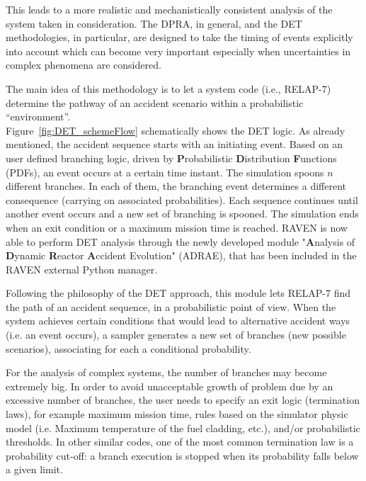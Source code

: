 \documentclass{mc2013}
\begin{document}
This leads to a more realistic and mechanistically consistent analysis of the system taken in consideration. The DPRA, in general, and the DET methodologies, in particular, are designed to take the timing of events explicitly into account which can become very important especially when uncertainties in complex phenomena are considered. 

The main idea of this methodology is to let a system code (i.e., RELAP-7) determine the pathway of an accident scenario within a probabilistic ``environment''. \\ Figure~\ref{fig:DET_schemeFlow} schematically shows the DET logic. As already mentioned, the accident sequence starts with an initiating event. Based on an user defined branching logic, driven by \textbf{P}robabilistic \textbf{D}istribution \textbf{F}unctions (PDFs), an event occurs at a certain time instant. The simulation spoons $n$ different branches. In each of them, the branching event determines a different consequence (carrying on associated probabilities). Each sequence continues until another event occurs and a new set of branching is spooned. The simulation ends when an exit condition or a maximum mission time is reached.    
\label{sec:DETRavenApproach}
RAVEN is now able to perform DET analysis through the newly developed module "\textbf{A}nalysis of \textbf{D}ynamic \textbf{R}eactor \textbf{A}ccident Evolution" (ADRAE), that has been included in the RAVEN external Python manager. 

Following the philosophy of the DET approach, this module lets RELAP-7 find the path of an accident sequence, in a probabilistic point of view. When the system achieves certain conditions that would lead to alternative accident ways (i.e. an event occurs), a sampler generates a new set of branches (new possible scenarios), associating for each a conditional probability.  

For the analysis of complex systems, the number of branches may become extremely big. In order to avoid unacceptable growth of problem due by an excessive number of branches, the user needs to specify an exit logic (termination laws), for example maximum mission time, rules based on the simulator physic model (i.e. Maximum temperature of the fuel cladding, etc.), and/or probabilistic thresholds. In other similar codes, one of the most common termination law is a probability cut-off: a branch execution is stopped when its probability falls below a given limit. 
 
\end{document}
